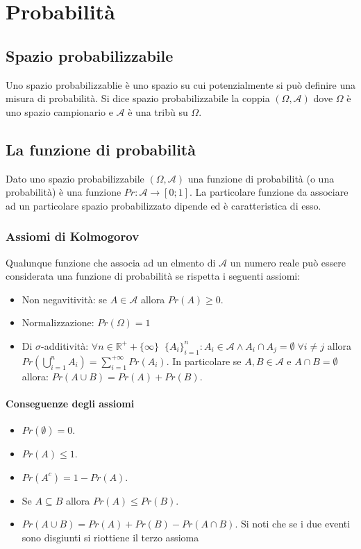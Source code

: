 \chapter{Probabilit\`a}
\section{Spazio probabilizzabile}
Uno spazio probabilizzablie \`e uno spazio su cui potenzialmente si pu\`o definire una misura di probabilit\`a. Si dice spazio probabilizzabile la coppia 
$(\Omega, \mathcal{A})$ dove $\Omega$ \`e uno spazio campionario e $\mathcal{A}$ \`e una trib\`u su $\Omega$. 
\section{La funzione di probabilit\`a}
Dato uno spazio probabilizzabile $(\Omega, \mathcal{A})$ una funzione di probabilit\`a (o una probabilit\`a) \`e una funzione $Pr:\mathcal{A}
\rightarrow[0;1]$. La particolare funzione da associare ad un particolare spazio probabilizzato dipende ed \`e caratteristica di esso.
\subsection{Assiomi di Kolmogorov}
Qualunque funzione che associa ad un elmento di $\mathcal{A}$ un numero reale pu\`o essere considerata una funzione di probabilit\`a se rispetta i 
seguenti assiomi:
\begin{itemize}
\item Non negavitivit\`a: se $A\in \mathcal{A}$ allora $Pr(A)\ge 0$.
\item Normalizzazione: $Pr(\Omega)=1$
\item Di $\sigma$-additivit\`a: $\forall n\in\mathbb{R}^++\{\infty\}\;\;\{A_i\}_{i=1}^{n}: A_i\in \mathcal{A}\wedge A_i\cap A_j=\emptyset\;\forall i\neq j
$ allora $Pr(\bigcup\limits_{i=1}^nA_i)=\sum\limits_{i=1}^{+\infty}Pr(A_i)$. In particolare se $A,B\in \mathcal{A}$ e $A\cap B=\emptyset$ allora: $Pr(A
\cup B)=Pr(A)+Pr(B)$.
\end{itemize}
\subsubsection{Conseguenze degli assiomi}
\begin{itemize}
\item $Pr(\emptyset)=0$.
\item $Pr(A)\le 1$.
\item $Pr(A^c)=1-Pr(A)$.
\item Se $A\subseteq B$ allora $Pr(A)\le Pr(B)$.
\item $Pr(A\cup B)=Pr(A)+Pr(B)-Pr(A\cap B)$. Si noti che se i due eventi sono disgiunti si riottiene il terzo assioma
\end{itemize}
